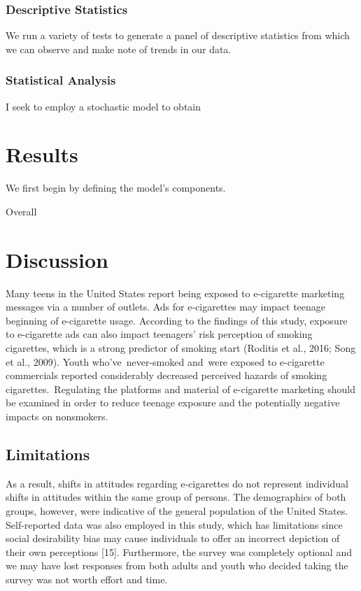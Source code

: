 \documentclass[12pt]{article}
\begin{document}
\subsubsection{Descriptive Statistics}

\hspace{5mm}We run a variety of tests to generate a panel of descriptive statistics from which we can observe and make note of trends in our data. 

\subsubsection{Statistical Analysis}

\hspace{5mm}I seek to employ a stochastic model to obtain

\section{Results} \label{sec:result}

\hspace{5mm}We first begin by defining the model's components. 

\hspace{5mm}Overall
\section{Discussion} \label{sec:discussion}

\hspace{5mm}Many teens in the United States report being exposed to e-cigarette marketing messages via a number of outlets. Ads for e-cigarettes may impact teenage beginning of e-cigarette usage. According to the findings of this study, exposure to e-cigarette ads can also impact teenagers' risk perception of smoking cigarettes, which is a strong predictor of smoking start (Roditis et al., 2016; Song et al., 2009). Youth who've never-smoked and were exposed to e-cigarette commercials reported considerably decreased perceived hazards of smoking cigarettes. Regulating the platforms and material of e-cigarette marketing should be examined in order to reduce teenage exposure and the potentially negative impacts on nonsmokers. 


\subsection{Limitations}
As a result, shifts in attitudes regarding e-cigarettes do not represent individual shifts in attitudes within the same group of persons. The demographics of both groups, however, were indicative of the general population of the United States. Self-reported data was also employed in this study, which has limitations since social desirability bias may cause individuals to offer an incorrect depiction of their own perceptions [15]. Furthermore, the survey was completely optional and we may have lost responses from both adults and youth who decided taking the survey was not worth effort and time. 
\end{document}
